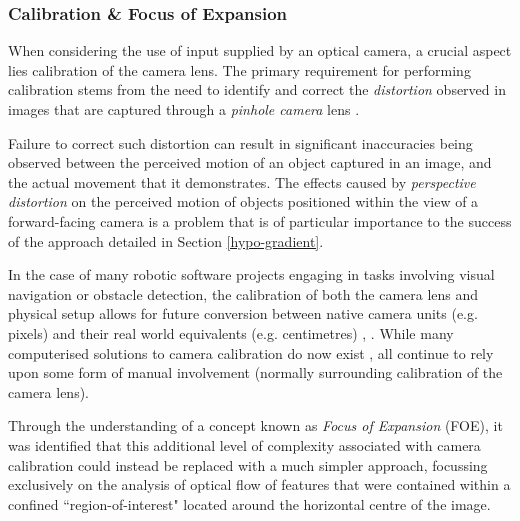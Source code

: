  
\subsubsection{Calibration \& Focus of Expansion}
\label{hypo-calib}

When considering the use of input supplied by an optical camera, a crucial aspect lies calibration of the camera lens. The primary requirement for performing calibration stems from the need to identify and correct the \textit{distortion} observed in images that are captured through a \textit{pinhole camera} lens \cite{camera-calib}. 

Failure to correct such distortion can result in significant inaccuracies being observed between the perceived motion of an object captured in an image, and the actual movement that it demonstrates. The effects caused by \textit{perspective distortion} on the perceived motion of objects positioned within the view of a forward-facing camera is a problem that is of particular importance to the success of the approach detailed in Section \ref{hypo-gradient}.


In the case of many robotic software projects engaging in tasks involving visual navigation or obstacle detection, the calibration of both the camera lens and physical setup allows for future conversion between native camera units (e.g. pixels) and their real world equivalents (e.g. centimetres) \cite{campbell}, \cite{wyeth}. While many computerised solutions to camera calibration do now exist \cite{camera-calib}, all continue to rely upon some form of manual involvement (normally surrounding calibration of the camera lens). 

Through the understanding of a concept known as \textit{Focus of Expansion} (FOE), it was identified that this additional level of complexity associated with camera calibration could instead be replaced with a much simpler approach, focussing exclusively on the analysis of optical flow of features that were contained within a confined ``region-of-interest" located around the horizontal centre of the image.

